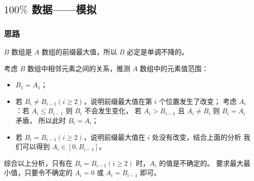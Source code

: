 
% 

\subsection{\texorpdfstring{$100\%$}{100\%} 数据——模拟}

\subsubsection{思路}

$B$ 数组是 $A$ 数组的前缀最大值，所以 $B$ 必定是单调不降的。

考虑 $B$ 数组中相邻元素之间的关系，推测 $A$ 数组中的元素值范围：

\begin{itemize}
    \item $B_1=A_1$；
    \item 若 $B_i\not=B_{i-1}(i\ge 2)$，说明前缀最大值在第 $i$ 个位置发生了改变；
          考虑 $A_i$：若 $A_i \le B_{i-1}$ 则 $B_i$ 不会发生变化，
          若 $A_i > B_{i-1}$ 且 $A_i\not=B_i$ 则 $B_i=A_i$ 矛盾，
          所以此时 $B_i=A_i$；
    \item 若 $B_i=B_{i-1}(i\ge 2)$，说明前缀最大值在 $i$ 处没有改变，结合上面的分析
          我们可以得到 $A_i \in [0, B_{i-1}]$。
\end{itemize}

综合以上分析，只有在 $B_{i}=B_{i-1}(i\ge 2)$ 时，$A_i$ 的值是不确定的。
要求最大最小值，只要令不确定的 $A_i=0$ 或 $A_i=B_{i-1}$ 即可。